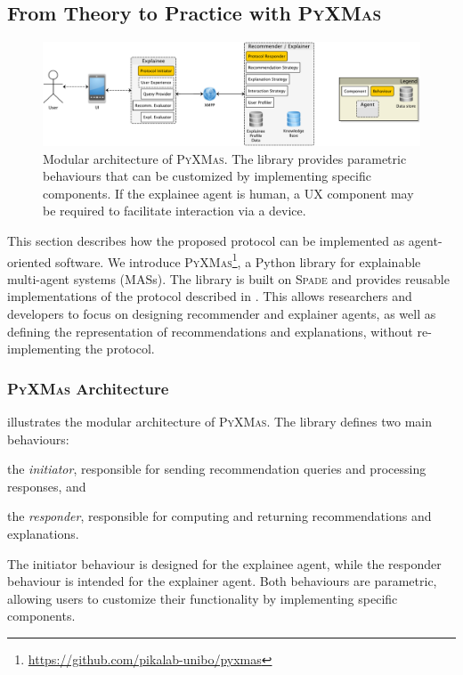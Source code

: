 \subsection{From Theory to Practice with \textsc{PyXMas}}
\label{subsec:from-theory-to-practice-with-pyxmas}
%
\begin{figure}
    \centering
    \includegraphics[width=\linewidth]{figures/pyxmas/architecture}
    \caption{
        Modular architecture of \textsc{PyXMas}.
        The library provides parametric behaviours that can be customized by implementing specific components.
        If the explainee agent is human, a UX component may be required to facilitate interaction via a device.
    }
    \label{fig:architecture}
\end{figure}
%
This section describes how the proposed protocol can be implemented as agent-oriented software.
%
We introduce \textsc{PyXMas}\footnote{\url{https://github.com/pikalab-unibo/pyxmas}}, a Python library for explainable multi-agent systems (\glspl{MAS}).
%
The library is built on \textsc{Spade} and provides reusable implementations of the protocol described in .
%
This allows researchers and developers to focus on designing recommender and explainer agents, as well as defining the representation of recommendations and explanations, without re-implementing the protocol.


\subsubsection{\textsc{PyXMas} Architecture}
\label{subsubsec:pyxmas-architecture}
%
 illustrates the modular architecture of \textsc{PyXMas}.
%
The library defines two main behaviours:
%
\begin{inlinelist}
    \item the \emph{initiator}, responsible for sending recommendation queries and processing responses, and
    \item the \emph{responder}, responsible for computing and returning recommendations and explanations.
\end{inlinelist}
%
The initiator behaviour is designed for the explainee agent, while the responder behaviour is intended for the explainer agent.
%
Both behaviours are parametric, allowing users to customize their functionality by implementing specific components.

